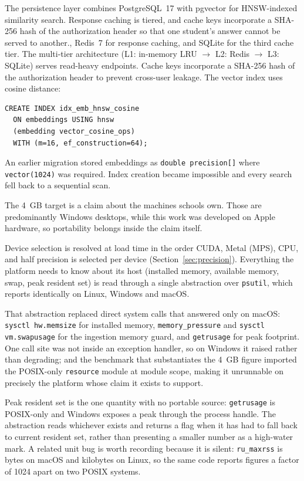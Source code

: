 The persistence layer combines PostgreSQL~17 with pgvector for HNSW-indexed similarity search\ifshort. Response caching is tiered, and cache keys incorporate a SHA-256 hash of the authorization header so that one student's answer cannot be served to another.\else, Redis~7 for response caching, and SQLite for the third cache tier. The multi-tier architecture (L1: in-memory LRU $\to$ L2: Redis $\to$ L3: SQLite) serves read-heavy endpoints. Cache keys incorporate a SHA-256 hash of the authorization header to prevent cross-user leakage. The vector index uses cosine distance:\fi
\ifshort\else  %
\begin{verbatim}
CREATE INDEX idx_emb_hnsw_cosine
  ON embeddings USING hnsw
  (embedding vector_cosine_ops)
  WITH (m=16, ef_construction=64);
\end{verbatim}
\fi

An earlier migration stored embeddings as \texttt{double precision[]} where \texttt{vector(1024)} was required. Index creation became impossible and every search fell back to a sequential scan.

\ifconf  %
\label{sec:hardware}
The 4~GB target is a claim about the machines schools own. Those are predominantly Windows desktops, while this work was developed on Apple hardware, so portability belongs inside the claim itself.

Device selection is resolved at load time in the order CUDA, Metal (MPS), CPU, and half precision is selected per device (Section~\ref{sec:precision}). Everything the platform needs to know about its host (installed memory, available memory, swap, peak resident set) is read through a single abstraction over \texttt{psutil}, which reports identically on Linux, Windows and macOS.

\ifshort\else  %
That abstraction replaced direct system calls that answered only on macOS: \texttt{sysctl hw.memsize} for installed memory, \texttt{memory\_pressure} and \texttt{sysctl vm.swapusage} for the ingestion memory guard, and \texttt{getrusage} for peak footprint. One call site was not inside an exception handler, so on Windows it raised rather than degrading; and the benchmark that substantiates the 4~GB figure imported the POSIX-only \texttt{resource} module at module scope, making it unrunnable on precisely the platform whose claim it exists to support.

Peak resident set is the one quantity with no portable source: \texttt{getrusage} is POSIX-only and Windows exposes a peak through the process handle. The abstraction reads whichever exists and returns a flag when it has had to fall back to current resident set, rather than presenting a smaller number as a high-water mark. A related unit bug is worth recording because it is silent: \texttt{ru\_maxrss} is bytes on macOS and kilobytes on Linux, so the same code reports figures a factor of 1024 apart on two POSIX systems.
\fi

